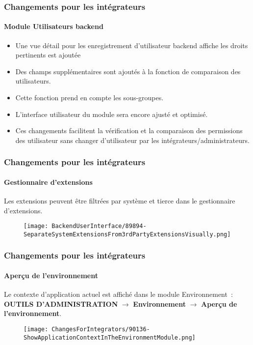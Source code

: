 
\begin{frame}[fragile]
	\frametitle{Changements pour les intégrateurs}
	\framesubtitle{Module Utilisateurs backend}

	\begin{itemize}
		\item Une vue détail pour les enregistrement d'utilisateur backend affiche les droits pertinents est ajoutée
		\item Des champs supplémentaires sont ajoutés à la fonction de comparaison des utilisateurs.
		\item Cette fonction prend en compte les sous-groupes.
		\item L'interface utilisateur du module sera encore ajusté et optimisé.
		\item Ces changements facilitent la vérification et la comparaison des permissions des
			utilisateur sans changer d'utilisateur par les intégrateurs/administrateurs.
	\end{itemize}

\end{frame}


\begin{frame}[fragile]
	\frametitle{Changements pour les intégrateurs}
	\framesubtitle{Gestionnaire d'extensions}

	Les extensions peuvent être filtrées par système et tierce dans le gestionnaire d'extensions.

	\begin{figure}
		\texttt{[image: BackendUserInterface/89894-SeparateSystemExtensionsFrom3rdPartyExtensionsVisually.png]}
	\end{figure}

\end{frame}


\begin{frame}[fragile]
	\frametitle{Changements pour les intégrateurs}
	\framesubtitle{Aperçu de l'environnement}

	Le contexte d'application actuel est affiché dans le module Environnement~:\newline
	\textbf{OUTILS D'ADMINISTRATION} $\rightarrow$ \textbf{Environnement} $\rightarrow$ \textbf{Aperçu de l'environnement}.

	\begin{figure}
		\texttt{[image: ChangesForIntegrators/90136-ShowApplicationContextInTheEnvironmentModule.png]}
	\end{figure}

\end{frame}

